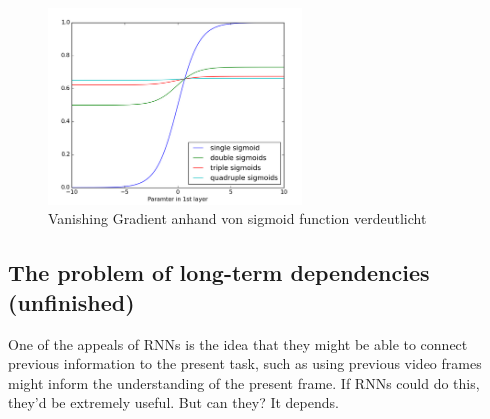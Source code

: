 {\renewcommand{\figurename}{Abb.}
\begin{figure}[htp]
\centering
\includegraphics[width=0.60\textwidth]{pictures/sigmoid_vanishing_gradient.png}
\caption[Sigmoid Funktion]{Vanishing Gradient anhand von sigmoid function verdeutlicht\protect\footnotemark}
\end{figure}

\subsection{The problem of long-term dependencies (unfinished)}
One of the appeals of RNNs is the idea that they might be able to connect previous information to the present task, such as using previous video frames might inform the understanding of the present frame. If RNNs could do this, they’d be extremely useful. But can they? It depends.

}
